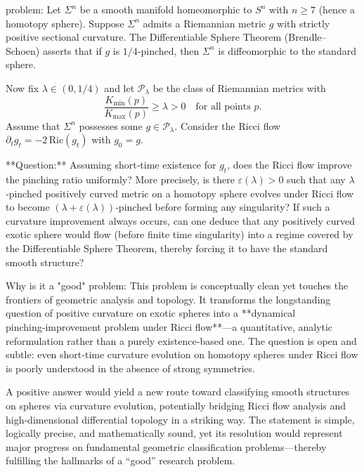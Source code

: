 problem:  
Let $\Sigma^n$ be a smooth manifold homeomorphic to $S^n$ with $n\ge7$ (hence a homotopy sphere). Suppose $\Sigma^n$ admits a Riemannian metric $g$ with strictly positive sectional curvature. The Differentiable Sphere Theorem (Brendle–Schoen) asserts that if $g$ is $1/4$‑pinched, then $\Sigma^n$ is diffeomorphic to the standard sphere.  

Now fix $\lambda\in(0,1/4)$ and let $\mathcal{P}_\lambda$ be the class of Riemannian metrics with  
\[
\frac{K_{\min}(p)}{K_{\max}(p)}\ge \lambda>0
\quad \text{for all points } p.
\]
Assume that $\Sigma^n$ possesses some $g\in\mathcal{P}_\lambda$.  
Consider the Ricci flow $\partial_t g_t = -2\,\mathrm{Ric}(g_t)$ with $g_0 = g$.

**Question:**  
Assuming short‑time existence for $g_t$, does the Ricci flow improve the pinching ratio uniformly?  
More precisely, is there $\varepsilon(\lambda)>0$ such that any $\lambda$‑pinched positively curved metric on a homotopy sphere evolves under Ricci flow to become $(\lambda+\varepsilon(\lambda))$‑pinched before forming any singularity?  
If such a curvature improvement always occurs, can one deduce that any positively curved exotic sphere would flow (before finite time singularity) into a regime covered by the Differentiable Sphere Theorem, thereby forcing it to have the standard smooth structure?  

Why is it a "good" problem:  
This problem is conceptually clean yet touches the frontiers of geometric analysis and topology. It transforms the longstanding question of positive curvature on exotic spheres into a **dynamical pinching‑improvement problem under Ricci flow**—a quantitative, analytic reformulation rather than a purely existence‑based one. The question is open and subtle: even short‑time curvature evolution on homotopy spheres under Ricci flow is poorly understood in the absence of strong symmetries.  

A positive answer would yield a new route toward classifying smooth structures on spheres via curvature evolution, potentially bridging Ricci flow analysis and high‑dimensional differential topology in a striking way. The statement is simple, logically precise, and mathematically sound, yet its resolution would represent major progress on fundamental geometric classification problems—thereby fulfilling the hallmarks of a “good” research problem.
